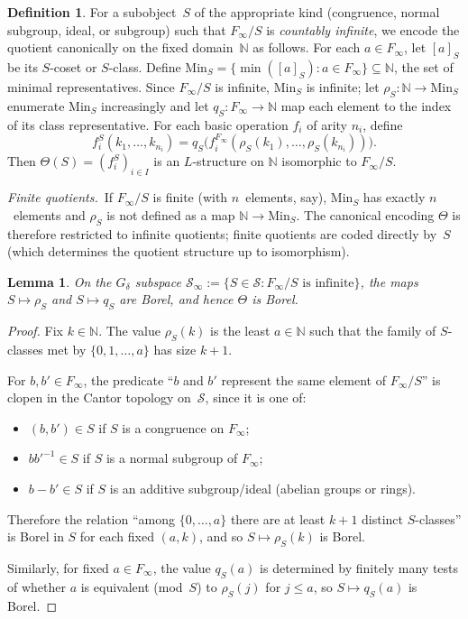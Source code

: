 \documentclass[12pt,fleqn,a4paper]{amsart}
\renewcommand{\le}{\leqslant}
\numberwithin{equation}{section}
\newtheorem{lemma}[theorem]{Lemma}
\theoremstyle{definition}
\newtheorem{definition}[theorem]{Definition}
\newcommand{\N}{\mathbb{N}}
\newcommand{\Min}{\mathrm{Min}}
\begin{document}
\begin{definition}\label{def:canonical-encoding}
For a subobject~$S$ of the appropriate kind (congruence, normal subgroup, ideal, or
subgroup) such that $F_\infty/S$ is \emph{countably infinite},
we encode the quotient
canonically on the fixed domain~$\N$ as follows.  For each $a\in F_\infty$, let
$[a]_S$ be its $S$-coset or $S$-class.  Define
$\Min_S=\{\min([a]_S):a\in F_\infty\}\subseteq\N$,
the set of minimal representatives.
Since $F_\infty/S$ is infinite, $\Min_S$ is infinite;
let $\rho_S:\N\to\Min_S$ enumerate $\Min_S$ increasingly and let $q_S:F_\infty\to\N$
map each element to the index of its class representative.  For each basic operation
$f_i$ of arity $n_i$, define
\[
f_i^S(k_1,\dots,k_{n_i})
=q_S\bigl(f_i^{F_\infty}(\rho_S(k_1),\dots,\rho_S(k_{n_i}))\bigr).
\]
Then $\Theta(S)=(f_i^S)_{i\in I}$ is an $L$-structure on $\N$ isomorphic
to $F_\infty/S$.

\smallskip\noindent
\emph{Finite quotients.}\
If $F_\infty/S$ is finite (with $n$~elements, say), $\Min_S$ has exactly
$n$~elements and $\rho_S$ is not defined as a map $\N\to\Min_S$.
The canonical encoding $\Theta$ is therefore restricted to
infinite quotients; finite quotients are coded directly
by~$S$ (which determines the quotient structure up to isomorphism).
\end{definition}

\begin{lemma}\label{lem:rho-q-Borel}
On the $G_\delta$ subspace
$\mathcal S_\infty:=\{S\in\mathcal S:F_\infty/S\text{ is infinite}\}$,
the maps $S\mapsto\rho_S$ and $S\mapsto q_S$ are Borel, and hence $\Theta$ is Borel.
\end{lemma}

\begin{proof}
Fix $k\in\N$.  The value $\rho_S(k)$ is the least $a\in\N$ such that the family of
$S$-classes met by $\{0,1,\ldots,a\}$ has size $k{+}1$.

For $b,b'\in F_\infty$, the predicate ``$b$ and $b'$ represent the same element of $F_\infty/S$''
is clopen in the Cantor topology on~$\mathcal S$, since it is one of:
\begin{itemize}
\item $(b,b')\in S$ if $S$ is a congruence on $F_\infty$;
\item $bb'^{-1}\in S$ if $S$ is a normal subgroup of $F_\infty$;
\item $b-b'\in S$ if $S$ is an additive subgroup/ideal (abelian groups or rings).
\end{itemize}
Therefore the relation ``among $\{0,\ldots,a\}$ there are at least $k{+}1$ distinct $S$-classes''
is Borel in $S$ for each fixed $(a,k)$, and so $S\mapsto\rho_S(k)$ is Borel.

Similarly, for fixed $a\in F_\infty$, the value $q_S(a)$ is determined by finitely many
tests of whether $a$ is equivalent (mod~$S$) to $\rho_S(j)$ for $j\le a$, so $S\mapsto q_S(a)$ is Borel.
\end{proof}
\end{document}
